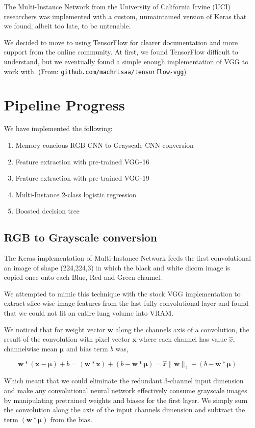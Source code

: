 \documentclass[twocolumn,10pt]{article}
\renewcommand{\b}{\boldsymbol}
\begin{document}
The Multi-Instance Network from the University of
California Irvine (UCI) researchers was implemented with a custom, unmaintained
version of Keras that we found, albeit too late, to be untenable. 

We decided to move to using TensorFlow for clearer documentation and more support
from the online community. At first, we found TensorFlow difficult to understand,
but we eventually found a simple enough implementation of VGG to work with.
(From: \texttt{github.com/machrisaa/tensorflow-vgg})

\section{Pipeline Progress}
We have implemented the following:
\begin{enumerate}[noitemsep]
  \item Memory concious RGB CNN to Grayscale CNN conversion
  \item Feature extraction with pre-trained VGG-16
  \item Feature extraction with pre-trained VGG-19
  \item Multi-Instance 2-class logistic regression
  \item Boosted decision tree
\end{enumerate}

\subsection{RGB to Grayscale conversion}
The Keras implementation of Multi-Instance Network feeds the first convolutional
an image of shape (224,224,3) in which the black and white dicom image is
copied once onto each Blue, Red and Green channel.

We attempted to mimic this technique with the stock VGG implementation to extract
slice-wise image features from the last fully convolutional layer and found that
we could not fit an entire lung volume into VRAM.

We noticed that for weight vector $\b w$ along the channels axis of a convolution, the
result of the convolution with pixel vector $\b x$ where each channel has value
$\hat x$, channelwise mean $\b \mu$ and bias
term $b$ was,

$$\b w \ast (\b x - \b \mu) + b = (\b w \ast \b x) + (b - \b w \ast \b \mu)
= \hat x \|\b w\|_1 + (b - \b w \ast \b \mu)$$

Which meant that we could eliminate the redundant 3-channel input dimension and
make any convolutional neural network effectively consume grayscale images by
 manipulating pretrained weights and biases for the first layer. We simply sum
 the convolution along the axis of the input channels dimension and subtract the
 term $(\b w \ast \b \mu)$ from the bias.
\end{document}

